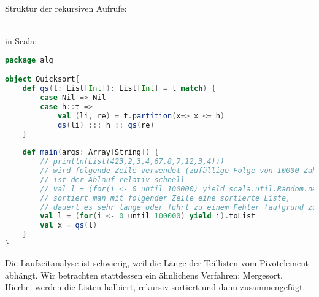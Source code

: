 \documentclass{scrreprt}
\begin{document}
Struktur der rekursiven Aufrufe:\smallskip\\
\\
in Scala:
\begin{lstlisting}[language=scala]
package alg

object Quicksort{
	def qs(l: List[Int]): List[Int] = l match) {
		case Nil => Nil
		case h::t =>
			val (li, re) = t.partition(x=> x <= h)
			qs(li) ::: h :: qs(re)
	}
	
	def main(args: Array[String]) {
		// println(List(423,2,3,4,67,8,7,12,3,4)))
		// wird folgende Zeile verwendet (zufällige Folge von 10000 Zahlen), 
		// ist der Ablauf relativ schnell
		// val l = (for(i <- 0 until 100000) yield scala.util.Random.nextInt).toList
		// sortiert man mit folgender Zeile eine sortierte Liste, 
		// dauert es sehr lange oder führt zu einem Fehler (aufgrund zu vieler Rekursionen)
		val l = (for(i <- 0 until 100000) yield i).toList
		val x = qs(l)
	}
}
\end{lstlisting}
Die Laufzeitanalyse ist schwierig, weil die Länge der Teillisten vom Pivotelement abhängt. Wir betrachten stattdessen ein ähnlichens Verfahren: Mergesort.\\
Hierbei werden die Listen halbiert, rekursiv sortiert und dann zusammengefügt.
\end{document}
